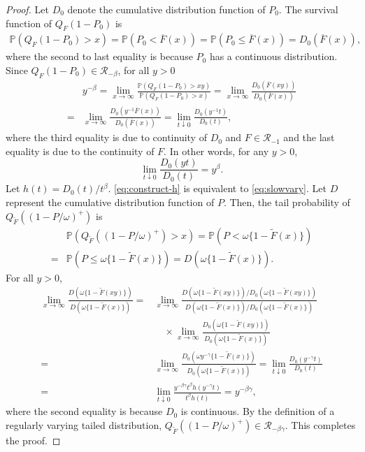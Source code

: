 \documentclass[12pt]{article}
\theoremstyle{plain}
\theoremstyle{plain}
\theoremstyle{definition}
\renewcommand{\Pr}{\mathbb{P}}
\begin{document}
\begin{proof}
Let $D_0$ denote the cumulative distribution function of $P_0$. The survival function of $Q_F(1-P_0)$ is
\begin{align*}
\Pr(Q_F(1-P_0)>x)= \Pr(P_0<\overline{F}(x))=\Pr(P_0\le\overline{F}(x))=D_0\left(\overline{F}(x)\right), 
\end{align*}
where the second to last equality is because $P_0$ has a continuous distribution.
Since $Q_F(1-P_0)\in\mathscr{R}_{-\beta}$, for all $y>0$
\begin{align*}
&y^{-\beta}
=\lim_{x\to\infty}\frac{\Pr\left(Q_F(1-P_0)>xy\right)}{\Pr\left(Q_F(1-P_0)>x\right)}
=\lim_{x\to\infty}\frac{D_0\left(\overline{F}(xy)\right)}{D_0\left(\overline{F}(x)\right)}\\
=&\lim_{x\to\infty}\frac{D_0\left(y^{-1}\overline{F}(x)\right)}{D_0\left(\overline{F}(x)\right)}
=\lim_{t\downarrow0}\frac{D_0\left(y^{-1}t\right)}{D_0\left(t\right)},  
\end{align*}
where the third equality is due to continuity of $D_0$ and $F\in \mathscr{R}_{-1}$ and the last equality is due to the continuity of $F$. In other words, for any $y>0$,
\begin{equation}
\label{eq:construct-h}
\lim_{t\downarrow0}\frac{D_0\left(yt\right)}{D_0\left(t\right)}=y^{\beta}.
\end{equation}
Let $h(t)=D_0(t)/t^\beta$. \eqref{eq:construct-h} is equivalent to  \eqref{eq:slowvary}.
Let $D$ represent the cumulative distribution function of $P$. Then, the tail probability of $Q_{\tilde F}\left((1-P/\omega)^+\right)$ is
\begin{align*}
&\Pr(Q_{\tilde F}\left((1-P/\omega)^+\right)>x)
= \Pr(P < \omega\{1-\tilde{F}(x)\})\\
=&\Pr(P \le \omega\{1-\tilde{F}(x)\})
=D\left(\omega\{1-\tilde F(x)\}\right).
\end{align*}
For all $y>0$,
\begin{align*}
\lim_{x\to\infty}\frac{D\left(\omega\{1-\tilde F(xy)\}\right)}{D\left(\omega\{1-\tilde F(x)\}\right)}
=&\lim_{x\to\infty}\frac{D\left(\omega\{1-\tilde F(xy)\}\right)/D_0\left(\omega\{1-\tilde F(xy)\}\right)}{D\left(\omega\{1-\tilde F(x)\}\right)/D_0\left(\omega\{1-\tilde F(x)\}\right)}\\
&\quad\times\lim_{x\to\infty}\frac{D_0\left(\omega\{1-\tilde F(xy)\}\right)}{D_0\left(\omega\{1-\tilde F(x)\}\right)}\\
=&\lim_{x\to\infty}\frac{D_0\left(\omega y^{-\gamma}\{1-\tilde F(x)\}\right)}{D_0\left(\omega\{1-\tilde F(x)\}\right)}
=\lim_{t\downarrow0}\frac{D_0\left(y^{-\gamma}t\right)}{D_0\left(t\right)}\\
=&\lim_{t\downarrow0}\frac{y^{-\beta\gamma} t^{\beta} h\left(y^{-\gamma}t\right)}{t^\beta h\left(t\right)}
=y^{-\beta\gamma},
\end{align*}
where the second equality is because $D_0$ is continuous. By the definition of a regularly varying tailed distribution, $Q_{\tilde F}\left((1-P/\omega)^+\right)\in\mathscr{R}_{-\beta\gamma}$. This completes the proof.
\end{proof}
\end{document}
